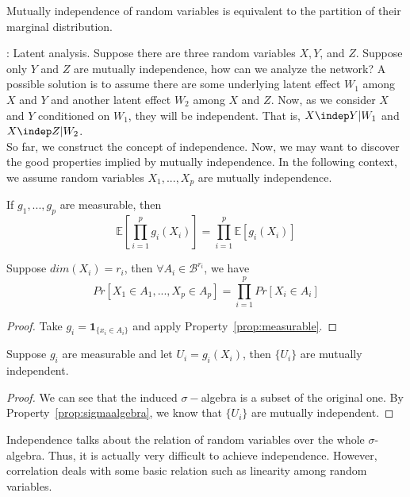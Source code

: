 \documentclass[../MultivariateProbabilityAndRelatedProperties.tex]{subfiles}
\begin{document}
\begin{intuition}
	Mutually independence of random variables is equivalent to the partition of their marginal distribution.
\end{intuition}

: Latent analysis. Suppose there are three random variables $X,Y$, and $Z$. Suppose only $Y$ and $Z$ are mutually independence, how can we analyze the network? A possible solution is to assume there are some underlying latent effect $W_1$ among $X$ and $Y$ and another latent effect $W_2$ among $X$ and $Z$. Now, as we consider $X$ and $Y$ conditioned on $W_1$, they will be independent. That is, $X\indep Y | W_1$ and $X\indep Z | W_2$.\\

So far, we construct the concept of independence. Now, we may want to discover the good properties implied by mutually independence. In the following context, we assume random variables $X_1,...,X_p$ are mutually independence.

\begin{property}\label{prop:measurable}
	If $g_1,...,g_p$ are measurable, then
	$$\mathbb{E}[\prod_{i=1}^p g_i(X_i)] = \prod_{i=1}^p\mathbb{E}[g_i(X_i)]$$
\end{property}

\begin{property}\label{prop:sigmaalgebra}
	Suppose $dim(X_i) = r_i$, then $\forall A_i\in\mathcal{B}^{r_i}$, we have
	$$Pr[X_1\in A_1,...,X_p\in A_p] = \prod_{i=1}^p Pr[X_i\in A_i]$$
\end{property}
\begin{proof}
	Take $g_i = \mathbf{1}_{\{x_i\in A_i \}}$ and apply Property~\ref{prop:measurable}.
\end{proof}

\begin{property}
	Suppose $g_i$ are measurable and let $U_i = g_i(X_i)$, then $\{U_i\}$ are mutually independent.
\end{property}
\begin{proof}
	We can see that the induced $\sigma-$algebra is a subset of the original one. By Property~\ref{prop:sigmaalgebra}, we know that $\{U_i\}$ are mutually independent.
\end{proof}

\begin{intuition}
	Independence talks about the relation of random variables over the whole $\sigma$-algebra. Thus, it is actually very difficult to achieve independence. However, correlation deals with some basic relation such as linearity among random variables.
\end{intuition}
\end{document}
